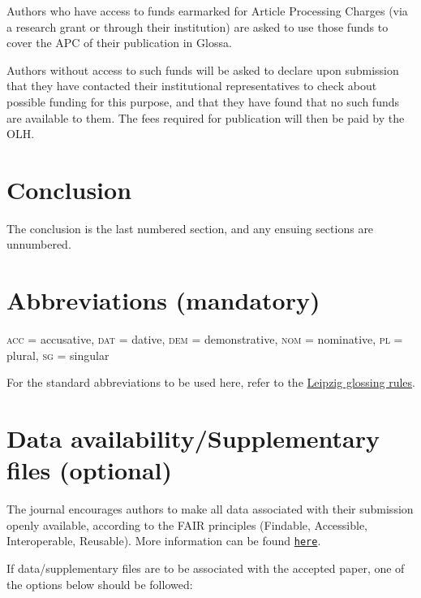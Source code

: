 \documentclass[cm,linguex]{glossa}
\begin{document}
Authors who have access to funds earmarked for Article Processing
Charges (via a research grant or through their institution) are asked to
use those funds to cover the APC of their publication in Glossa.

Authors without access to such funds will be asked to declare upon
submission that they have contacted their institutional representatives
to check about possible funding for this purpose, and that they have
found that no such funds are available to them. The fees required for
publication will then be paid by the OLH.

\hypertarget{conclusion}{%
\section{Conclusion}\label{conclusion}}

The conclusion is the last numbered section, and any ensuing sections
are unnumbered.

\hypertarget{abbrev}{%
\section*{Abbreviations (mandatory)}\label{abbrev}}

\textsc{acc} = accusative, \textsc{dat} = dative, \textsc{dem} =
demonstrative, \textsc{nom} = nominative, \textsc{pl} = plural,
\textsc{sg} = singular

For the standard abbreviations to be used here, refer to the
\href{https://www.eva.mpg.de/lingua/resources/glossing-rules.php}{Leipzig
glossing rules}.

\hypertarget{data-availabilitysupplementary-files-optional}{%
\section*{Data availability/Supplementary files
(optional)}\label{data-availabilitysupplementary-files-optional}}

The journal encourages authors to make all data associated with their
submission openly available, according to the FAIR principles (Findable,
Accessible, Interoperable, Reusable). More information can be found
\href{https://www.glossa-journal.org/about/editorialpolicies/\#data-policy}{\texttt{here}}.

If data/supplementary files are to be associated with the accepted
paper, one of the options below should be followed:
\end{document}
